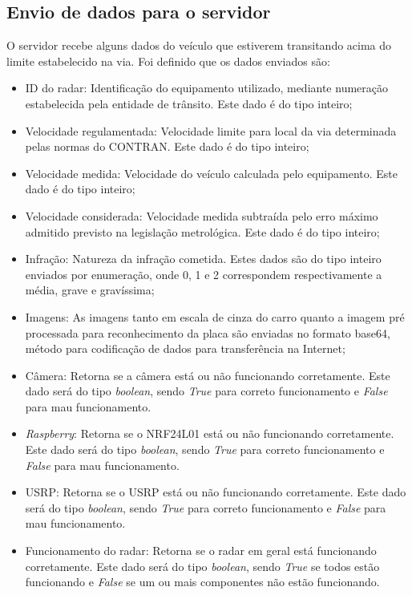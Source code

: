 \subsection{Envio de dados para o servidor} \label{serv}
    
O servidor recebe alguns dados do veículo que estiverem transitando acima do limite estabelecido na via. Foi definido que os dados enviados são: 

    \begin{itemize}
        \item ID do radar: Identificação do equipamento utilizado, mediante numeração estabelecida pela entidade de trânsito. Este dado é do tipo inteiro;
        \item Velocidade regulamentada: Velocidade limite para  local da via determinada pelas normas do CONTRAN\cite{conatran}. Este dado é do tipo inteiro;
        \item Velocidade medida: Velocidade  do veículo calculada pelo equipamento. Este dado é do tipo inteiro;
        \item Velocidade considerada: Velocidade medida subtraída pelo erro máximo admitido previsto na legislação metrológica. Este dado é do tipo inteiro;
        \item Infração: Natureza da infração cometida. Estes dados são do tipo inteiro enviados por enumeração, onde 0, 1 e 2 correspondem respectivamente a média, grave e gravíssima;
        \item Imagens: As imagens tanto em escala de cinza do carro quanto a imagem pré processada para reconhecimento da placa são enviadas no formato base64, método para codificação de dados para transferência na Internet;
        \item Câmera: Retorna se a câmera está ou não funcionando corretamente. Este dado será do tipo \emph{boolean}, sendo \emph{True} para correto funcionamento e \emph{False} para mau funcionamento. 
        \item \emph{Raspberry}: Retorna se o NRF24L01 está ou não funcionando corretamente. Este dado será do tipo \emph{boolean}, sendo \emph{True} para correto funcionamento e \emph{False} para mau funcionamento.
        \item USRP: Retorna se o USRP está ou não funcionando corretamente.  Este dado será do tipo \emph{boolean}, sendo \emph{True} para correto funcionamento e \emph{False} para mau funcionamento.
        \item Funcionamento do radar: Retorna se o radar em geral está funcionando corretamente. Este dado será do tipo \emph{boolean}, sendo \emph{True} se todos estão funcionando e \emph{False} se um ou mais componentes não estão funcionando.
        \end{itemize} 
        

